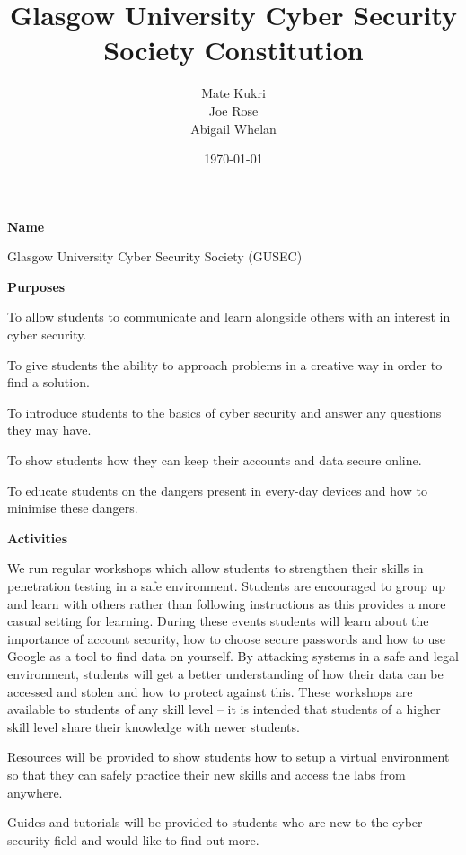 \documentclass[11pt]{article}
\title{Glasgow University Cyber Security Society Constitution}
\date{\today}
\author{Mate Kukri\\ Joe Rose\\ Abigail Whelan}
\newcommand{\headItem}[1]{\global\isHeadtrue\item {\bfseries #1}}
\newif\ifisHead
\begin{document}
	
	\maketitle
	\begin{level}
		\headItem{Name}
		
		Glasgow University Cyber Security Society (GUSEC)
		
		\headItem {Purposes}
		\begin{level}
			\item To allow students to communicate and learn alongside others with an interest in cyber security.
			\item To give students the ability to approach problems in a creative way in order to find a solution.
			\item To introduce students to the basics of cyber security and answer any questions they may have.
			\item To show students how they can keep their accounts and data secure online.
			\item To educate students on the dangers present in every-day devices and how to minimise these dangers.
			
		\end{level}
	
		\headItem {Activities}
		\begin{level}
			\item We run regular workshops which allow students to strengthen their skills in penetration testing in a safe environment. Students are encouraged to group up and learn with others rather than following instructions as this provides a more casual setting for learning. During these events students will learn about the importance of account security, how to choose secure passwords and how to use Google as a tool to find data on yourself. By attacking systems in a safe and legal environment, students will get a better understanding of how their data can be accessed and stolen and how to protect against this. These workshops are available to students of any skill level -- it is intended that students of a higher skill level share their knowledge with newer students.
			\item Resources will be provided to show students how to setup a virtual environment so that they can safely practice their new skills and access the labs from anywhere.
			\item Guides and tutorials will be provided to students who are new to the cyber security field and would like to find out more.
			

\end{level}
\end{level}
\end{document}
